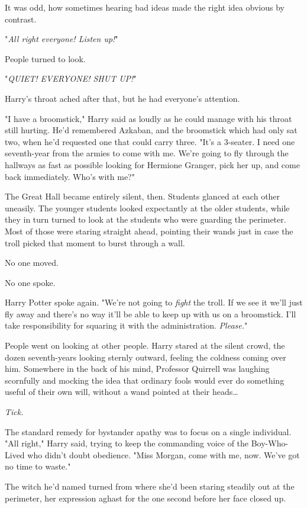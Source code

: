 It was odd, how sometimes hearing bad ideas made the right idea obvious by 
contrast.

"\emph{All right everyone! Listen up!}"

People turned to look.

"\emph{QUIET! EVERYONE! SHUT UP!}"

Harry's throat ached after that, but he had everyone's attention.

"I have a broomstick," Harry said as loudly as he could manage with his throat 
still hurting. He'd remembered Azkaban, and the broomstick which had only sat 
two, when he'd requested one that could carry three. "It's a 3-seater. I need 
one seventh-year from the armies to come with me. We're going to fly through 
the hallways as fast as possible looking for Hermione Granger, pick her up, and 
come back immediately. Who's with me?"

The Great Hall became entirely silent, then.
\sbreak
Students glanced at each other uneasily. The younger students looked 
expectantly at the older students, while they in turn turned to look at the 
students who were guarding the perimeter. Most of those were staring straight 
ahead, pointing their wands just in case the troll picked that moment to burst 
through a wall.

No one moved.

No one spoke.

Harry Potter spoke again. "We're not going to \emph{fight} the troll. If we see 
it we'll just fly away and there's no way it'll be able to keep up with us on a 
broomstick. I'll take responsibility for squaring it with the administration. 
\emph{Please.}"

People went on looking at other people.
\sbreak
Harry stared at the silent crowd, the dozen seventh-years looking sternly 
outward, feeling the coldness coming over him. Somewhere in the back of his 
mind, Professor Quirrell was laughing scornfully and mocking the idea that 
ordinary fools would ever do something useful of their own will, without a wand 
pointed at their heads{\ldots}

\emph{Tick.}

The standard remedy for bystander apathy was to focus on a single individual. 
"All right," Harry said, trying to keep the commanding voice of the 
Boy-Who-Lived who didn't doubt obedience. "Miss Morgan, come with me, now. 
We've got no time to waste."

The witch he'd named turned from where she'd been staring steadily out at the 
perimeter, her expression aghast for the one second before her face closed up.

